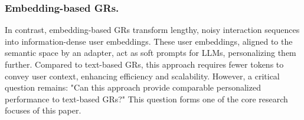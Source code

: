 \subsubsection{\textbf{Embedding-based GRs.}}
In contrast, embedding-based GRs transform lengthy, noisy interaction sequences into information-dense user embeddings. These user embeddings, aligned to the semantic space by an adapter, act as soft prompts for LLMs, personalizing them further. Compared to text-based GRs, this approach requires fewer tokens to convey user context, enhancing efficiency and scalability. However, a critical question remains: "Can this approach provide comparable personalized performance to text-based GRs?" This question forms one of the core research focuses of this paper.





